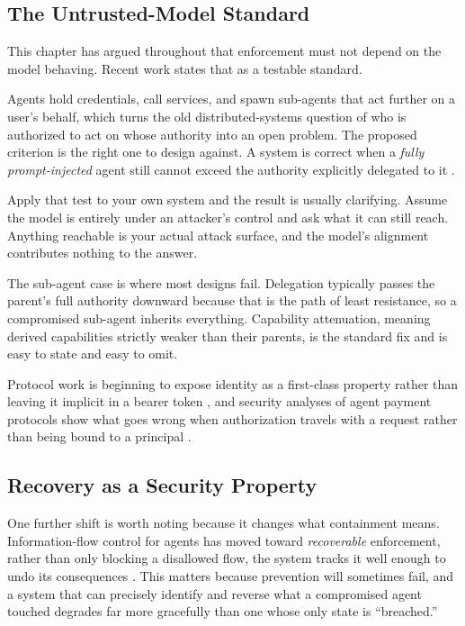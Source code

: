 \subsection{The Untrusted-Model Standard}

This chapter has argued throughout that enforcement must not depend on the model
behaving. Recent work states that as a testable standard.

Agents hold credentials, call services, and spawn sub-agents that act further on
a user's behalf, which turns the old distributed-systems question of who is
authorized to act on whose authority into an open problem. The proposed criterion
is the right one to design against. A system is correct when a \emph{fully
prompt-injected} agent still cannot exceed the authority explicitly delegated to
it \cite{delegation2026}.

Apply that test to your own system and the result is usually clarifying. Assume
the model is entirely under an attacker's control and ask what it can still
reach. Anything reachable is your actual attack surface, and the model's
alignment contributes nothing to the answer.

The sub-agent case is where most designs fail. Delegation typically passes the
parent's full authority downward because that is the path of least resistance,
so a compromised sub-agent inherits everything. Capability attenuation, meaning
derived capabilities strictly weaker than their parents, is the standard fix and
is easy to state and easy to omit.

Protocol work is beginning to expose identity as a first-class property rather
than leaving it implicit in a bearer token \cite{identityproto2026}, and security
analyses of agent payment protocols show what goes wrong when authorization
travels with a request rather than being bound to a principal
\cite{ap2sec2026}.

\subsection{Recovery as a Security Property}

One further shift is worth noting because it changes what containment means.
Information-flow control for agents has moved toward \emph{recoverable}
enforcement, rather than only blocking a disallowed flow, the system tracks it
well enough to undo its consequences \cite{appa2026}. This matters because
prevention will sometimes fail, and a system that can precisely identify and
reverse what a compromised agent touched degrades far more gracefully than one
whose only state is ``breached.''

